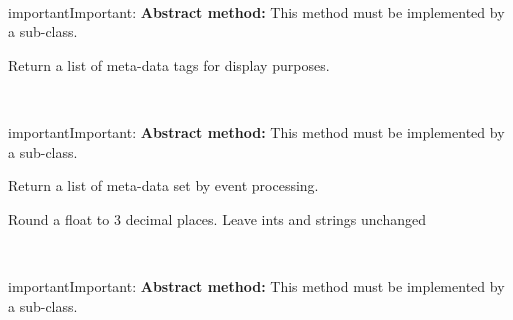 \documentclass[letterpaper,10pt,english]{sphinxmanual}
\begin{document}
\begin{fulllineitems}
\begin{fulllineitems}
\label{api-doc/mosaic.meta:mosaic.metaEventProcessor.metaEventProcessor._mdHeadings}~
\begin{notice}{important}{Important:}
\textbf{Abstract method:} This method must be implemented by a sub-class.
\end{notice}

Return a list of meta-data tags for display purposes.

\end{fulllineitems}


\begin{fulllineitems}
\label{api-doc/mosaic.meta:mosaic.metaEventProcessor.metaEventProcessor._mdList}~
\begin{notice}{important}{Important:}
\textbf{Abstract method:} This method must be implemented by a sub-class.
\end{notice}

Return a list of meta-data set by event processing.

\end{fulllineitems}


\begin{fulllineitems}
\label{api-doc/mosaic.meta:mosaic.metaEventProcessor.metaEventProcessor._metaEventProcessor__mdformat}
Round a float to 3 decimal places. Leave ints and strings unchanged

\end{fulllineitems}


\begin{fulllineitems}
\label{api-doc/mosaic.meta:mosaic.metaEventProcessor.metaEventProcessor._processEvent}~
\begin{notice}{important}{Important:}
\textbf{Abstract method:} This method must be implemented by a sub-class.
\end{notice}

\end{fulllineitems}


\end{fulllineitems}
\end{document}
